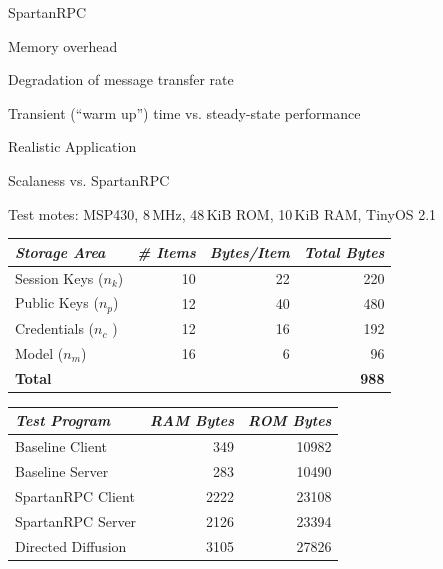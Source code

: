 
\begin{citemize}

\item SpartanRPC
\begin{citemize}
\item Memory overhead
\item Degradation of message transfer rate
\item Transient (``warm up'') time vs. steady-state performance
\end{citemize}

\item Realistic Application
\begin{citemize}
\item Scalaness vs. SpartanRPC
\end{citemize}
\end{citemize}

{\small Test motes: MSP430, 8\,MHz, 48\,KiB ROM, 10\,KiB RAM, TinyOS 2.1}
\stopslide


\centering
  \begin{tabular}{|l|r|r|r|} \hline
    \textit{Storage Area} \T & \textit{\# Items} & \textit{Bytes/Item} & \textit{Total Bytes} \\
    \hline \hline

    Session Keys ($n_k$) \T & 10 & 22 & 220 \\ \hline 
    Public Keys ($n_p$)  \T & 12 & 40 & 480 \\ \hline
    Credentials ($n_c$ ) \T & 12 & 16 & 192 \\ \hline
    Model ($n_m$)        \T & 16 &  6 &  96 \\ \hline \hline
    \textbf{Total} \T & \multicolumn{3}{r|}{ \textbf{988} } \\ \hline
  \end{tabular}
\stopslide


\centering
  \begin{tabular}{|l|r|r|} \hline
    \textit{Test Program} \T & \textit{RAM Bytes} & \textit{ROM Bytes} \\
    \hline \hline

    Baseline Client    \T &  349 & 10982 \\ \hline 
    Baseline Server    \T &  283 & 10490 \\ \hline
    SpartanRPC Client  \T & 2222 & 23108 \\ \hline
    SpartanRPC Server  \T & 2126 & 23394 \\ \hline
    Directed Diffusion \T & 3105 & 27826 \\ \hline
  \end{tabular}
\stopslide


